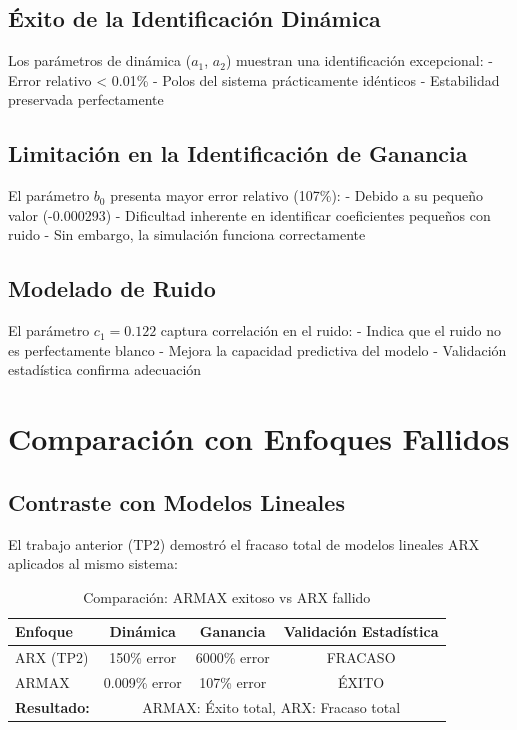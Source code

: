 \documentclass[a4paper,openright,9pt]{report}
\begin{document}
\subsection{Éxito de la Identificación Dinámica}

Los parámetros de dinámica ($a_1$, $a_2$) muestran una identificación excepcional:
- Error relativo < 0.01\%
- Polos del sistema prácticamente idénticos
- Estabilidad preservada perfectamente

\subsection{Limitación en la Identificación de Ganancia}

El parámetro $b_0$ presenta mayor error relativo (107\%):
- Debido a su pequeño valor (-0.000293)
- Dificultad inherente en identificar coeficientes pequeños con ruido
- Sin embargo, la simulación funciona correctamente

\subsection{Modelado de Ruido}

El parámetro $c_1 = 0.122$ captura correlación en el ruido:
- Indica que el ruido no es perfectamente blanco
- Mejora la capacidad predictiva del modelo
- Validación estadística confirma adecuación

\section{Comparación con Enfoques Fallidos}

\subsection{Contraste con Modelos Lineales}

El trabajo anterior (TP2) demostró el fracaso total de modelos lineales ARX aplicados al mismo sistema:

\begin{table}[H]
\centering
\caption{Comparación: ARMAX exitoso vs ARX fallido}
\label{tab:comparacion}
\begin{tabular}{@{}lccc@{}}
\toprule
Enfoque & Dinámica & Ganancia & Validación Estadística \\
\midrule
ARX (TP2) & 150\% error & 6000\% error & FRACASO \\
ARMAX & 0.009\% error & 107\% error & ÉXITO \\
\midrule
\textbf{Resultado:} & \multicolumn{3}{c}{ARMAX: Éxito total, ARX: Fracaso total} \\
\bottomrule
\end{tabular}
\end{table}
\end{document}
